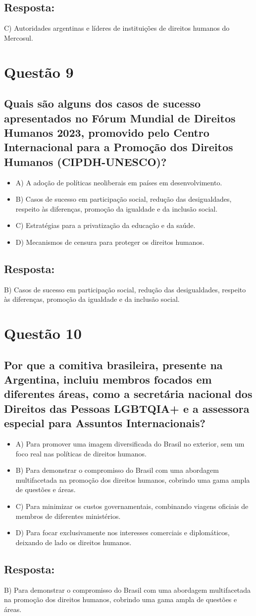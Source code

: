 \documentclass[
   article,       
   12pt,          
   oneside,       
   a4paper,       
   english,       
   brazil,        
   sumario=tradicional
   ]{abntex2}
\begin{document}
\subsection{Resposta:}
C) Autoridades argentinas e líderes de instituições de direitos humanos do Mercosul.


\section{Questão 9}
\subsection*{Quais são alguns dos casos de sucesso apresentados no Fórum Mundial de Direitos Humanos 2023, promovido pelo Centro Internacional para a Promoção dos Direitos Humanos (CIPDH-UNESCO)?}
\begin{itemize}
    \item A) A adoção de políticas neoliberais em países em desenvolvimento.
    \item B) Casos de sucesso em participação social, redução das desigualdades, respeito às diferenças, promoção da igualdade e da inclusão social.
    \item C) Estratégias para a privatização da educação e da saúde.
    \item D) Mecanismos de censura para proteger os direitos humanos.
\end{itemize}
\subsection{Resposta:}
B) Casos de sucesso em participação social, redução das desigualdades, respeito às diferenças, promoção da igualdade e da inclusão social.


\section{Questão 10}
\subsection*{Por que a comitiva brasileira, presente na Argentina, incluiu membros focados em diferentes áreas, como a secretária nacional dos Direitos das Pessoas LGBTQIA+ e a assessora especial para Assuntos Internacionais?}
\begin{itemize}
    \item A) Para promover uma imagem diversificada do Brasil no exterior, sem um foco real nas políticas de direitos humanos.
    \item B) Para demonstrar o compromisso do Brasil com uma abordagem multifacetada na promoção dos direitos humanos, cobrindo uma gama ampla de questões e áreas.
    \item C) Para minimizar os custos governamentais, combinando viagens oficiais de membros de diferentes ministérios.
    \item D) Para focar exclusivamente nos interesses comerciais e diplomáticos, deixando de lado os direitos humanos.
\end{itemize}
\subsection{Resposta:}
B) Para demonstrar o compromisso do Brasil com uma abordagem multifacetada na promoção dos direitos humanos, cobrindo uma gama ampla de questões e áreas.
\postextual

\end{document}
